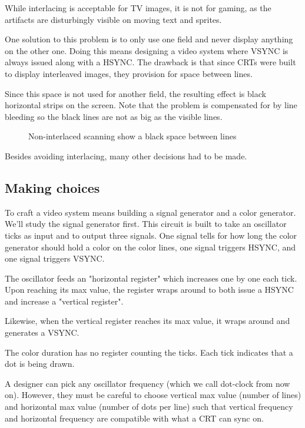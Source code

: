 While interlacing is acceptable for TV images, it is not for gaming, as the artifacts are disturbingly visible on moving text and sprites. 

One solution to this problem is to only use one field and never display anything on the other one. Doing this means designing a video system where VSYNC is always issued along with a HSYNC. The drawback is that since CRTs were built to display interleaved images, they provision for space between lines. 

Since this space is not used for another field, the resulting effect is black horizontal strips on the screen. Note that the problem is compensated for by line bleeding so the black lines are not as big as the visible lines.

\begin{figure}[H]
\caption*{Non-interlaced scanning show a black space between lines}
\end{figure}


Besides avoiding interlacing, many other decisions had to be made.





\subsection{Making choices}

To craft a video system means building a signal generator and a color generator. We'll study the signal generator first. This circuit is built to take an oscillator ticks as input and to output three signals. One signal tells for how long the color generator should hold a color on the color lines, one signal triggers HSYNC, and one signal triggers VSYNC. 


The oscillator feeds an "horizontal register" which increases one by one each tick. Upon reaching its max value, the register wraps around to both issue a HSYNC and increase a "vertical register". 

Likewise, when the vertical register reaches its max value, it wraps around and generates a VSYNC. 

The color duration has no register counting the ticks. Each tick indicates that a dot is being drawn.

A designer can pick any oscillator frequency (which we call dot-clock from now on). However, they must be careful to choose vertical max value (number of lines) and horizontal max value (number of dots per line) such that vertical frequency and horizontal frequency are compatible with what a CRT can sync on. 

